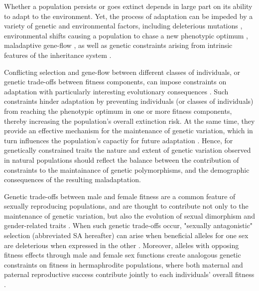 \documentclass[11pt]{article}
\begin{document}
Whether a population persists or goes extinct depends in large part on its ability to adapt to the environment. Yet, the process of adaptation can be impeded by a variety of genetic and environmental factors, including deleterious mutations \citep{Haldane1957}, environmental shifts causing a population to chase a new phenotypic optimum \citep{Maynard-Smith1976, LandeShannon1996,OrrUnckless2008}, maladaptive gene-flow \citep{KirkpatrickBarton1997, BolnickNosil2007}, as well as genetic constraints arising from intrinsic features of the inheritance system \citep{ConnallonHall2018}. 

Conflicting selection and gene-flow between different classes of individuals, or genetic trade-offs between fitness components, can impose constraints on adaptation with particularly interesting evolutionary consequences \citep{CharlesworthHughes2000, ConnallonHall2018}. Such constraints hinder adaptation by preventing individuals (or classes of individuals) from reaching the phenotypic optimum in one or more fitness components, thereby increasing the population's overall extinction risk. At the same time, they provide an effective mechanism for the maintenance of genetic variation, which in turn influences the population's capactiy for future adaptation \citep{Fisher1930, CharlesworthHughes2000, ConnallonHall2018, MatthewsConnallon2019}. Hence, for genetically constrained traits the nature and extent of genetic variation observed in natural populations should reflect the balance between the contribution of constraints to the maintainance of genetic polymorphisms, and the demographic consequences of the resulting maladaptation.

Genetic trade-offs between male and female fitness are a common feature of sexually reproducing populations, and are thought to contribute not only to the maintenance of genetic variation, but also the evolution of sexual dimorphism and gender-related traits \citep{Lande1980, Rice1992, Charlesworth1999, RiceChippindale2001, BondurianskyChenoweth2009,Olito2019}. When such genetic trade-offs occur, "sexually antagonistic" selection (abbreviated SA hereafter) can arise when beneficial alleles for one sex are deleterious when expressed in the other \citep{Kidwell1977, Rice1992, ConnallonClark2012}. Moreover, alleles with opposing fitness effects through male and female sex functions create analogous genetic constraints on fitness in hermaphrodite populations, where both maternal and paternal reproductive success contribute jointly to each individuals' overall fitness \citep{LloydWebb1986, WebbLloyd1986, Abbott2011, JordanConnallon2014}. 
\end{document}
